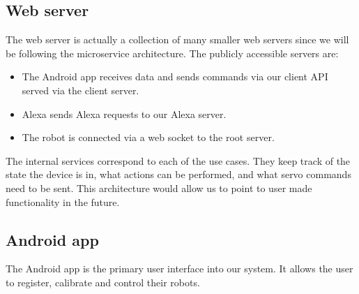 \documentclass[onecolumn]{IEEEtran}
\begin{document}
\subsection{Web server}

The web server is actually a collection of many smaller web servers since we will be following the microservice architecture. The publicly accessible servers are:

\begin{itemize}
    \item The Android app receives data and sends commands via our client API served via the client server. 
    \item Alexa sends Alexa requests to our Alexa server.
    \item The robot is connected via a web socket to the root server.
\end{itemize}

The internal services correspond to each of the use cases. They keep track of the state the device is in, what actions can be performed, and what servo commands need to be sent. This architecture would allow us to point to user made functionality in the future.

\subsection{Android app}

The Android app is the primary user interface into our system. It allows the user to register, calibrate and control their robots.
\end{document}
